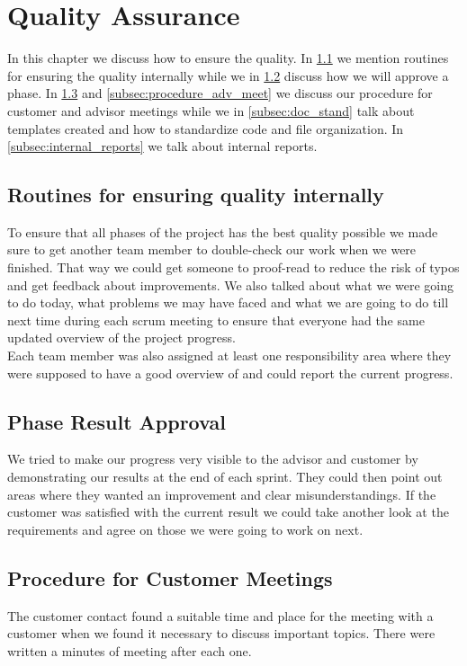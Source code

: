 \documentclass{report}
\begin{document}
\section{Quality Assurance} \label{sec:quality_assurance}
In this chapter we discuss how to ensure the quality. In \ref{subsec:routines} we mention routines for ensuring the quality internally while we in \ref{subsec:phase_result} discuss how we will approve a phase. In \ref{subsec:procedure_cust_meet} and \ref{subsec:procedure_adv_meet} we discuss our procedure for customer and advisor meetings while we in \ref{subsec:doc_stand} talk about templates created and how to standardize code and file organization. In \ref{subsec:internal_reports} we talk about internal reports.

\subsection{Routines for ensuring quality internally} \label{subsec:routines}
To ensure that all phases of the project has the best quality possible we made sure to get another team member to double-check our work when we were finished. That way we could get someone to proof-read to reduce the risk of typos and get feedback about improvements. We also talked about what we were going to do today, what problems we may have faced and what we are going to do till next time during each scrum meeting to ensure that everyone had the same updated overview of the project progress.
\\
Each team member was also assigned at least one responsibility area where they were supposed to have a good overview of and could report the current progress.

\subsection{Phase Result Approval} \label{subsec:phase_result}
We tried to make our progress very visible to the advisor and customer by demonstrating our results at the end of each sprint. They could then point out areas where they wanted an improvement and clear misunderstandings. If the customer was satisfied with the current result we could take another look at the requirements and agree on those we were going to work on next.

\subsection{Procedure for Customer Meetings} \label{subsec:procedure_cust_meet}
The customer contact found a suitable time and place for the meeting with a customer when we found it necessary to discuss important topics. There were written a minutes of meeting after each one.
\end{document}
